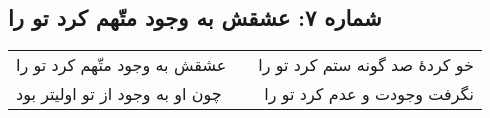 \begin{center}
\section*{شماره ۷: عشقش به وجود متّهم کرد تو را}
\label{sec:007}
\begin{longtable}{l p{0.5cm} r}
عشقش به وجود متّهم کرد تو را
&&
خو کردهٔ صد گونه ستم کرد تو را
\\
چون او به وجود از تو اولیتر بود
&&
نگرفت وجودت و عدم کرد تو را
\\
\end{longtable}
\end{center}
